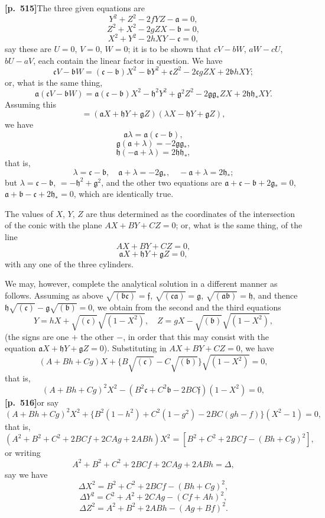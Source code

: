 \documentclass[11pt,a4paper]{article}
\begin{document}
\noindent\textbf{[p.~515]}\quad The three given equations are
\[
Y^{2} + Z^{2} - 2fYZ - \mathfrak{a} = 0,
\]
\[
Z^{2} + X^{2} - 2gZX - \mathfrak{b} = 0,
\]
\[
X^{2} + Y^{2} - 2hXY - \mathfrak{c} = 0,
\]
say these are $U = 0$, $V = 0$, $W = 0$; it is to be shown that $cV - bW$, $aW - cU$, $bU - aV$, each contain the linear factor in question. We have
\[
\mathfrak{c}V - \mathfrak{b}W = (\mathfrak{c} - \mathfrak{b})X^{2} - \mathfrak{b}Y^{2} + \mathfrak{c}Z^{2} - 2\mathfrak{c}gZX + 2\mathfrak{b}hXY;
\]
or, what is the same thing,
\[
\mathfrak{a}(\mathfrak{c}V - \mathfrak{b}W) = \mathfrak{a}(\mathfrak{c} - \mathfrak{b})X^{2} - \mathfrak{h}^{2}Y^{2} + \mathfrak{g}^{2}Z^{2} - 2\mathfrak{g}\mathfrak{g}_{*}ZX + 2\mathfrak{h}\mathfrak{h}_{*}XY.
\]
Assuming this
\[
= (\mathfrak{a}X + \mathfrak{h}Y + \mathfrak{g}Z)(\lambda X - \mathfrak{h}Y + \mathfrak{g}Z),
\]
we have
\[
\mathfrak{a}\lambda = \mathfrak{a}(\mathfrak{c} - \mathfrak{b}),
\]
\[
\mathfrak{g}(\mathfrak{a} + \lambda) = -2\mathfrak{g}\mathfrak{g}_{*},
\]
\[
\mathfrak{h}(-\mathfrak{a} + \lambda) = 2\mathfrak{h}\mathfrak{h}_{*},
\]
that is,
\[
\lambda = \mathfrak{c} - \mathfrak{b},\quad \mathfrak{a} + \lambda = -2\mathfrak{g}_{*},\quad -\mathfrak{a} + \lambda = 2\mathfrak{h}_{*};
\]
but $\lambda = \mathfrak{c} - \mathfrak{b}$, $= -\mathfrak{h}^{2} + \mathfrak{g}^{2}$, and the other two equations are $\mathfrak{a} + \mathfrak{c} - \mathfrak{b} + 2\mathfrak{g}_{*} = 0$, $\mathfrak{a} + \mathfrak{b} - \mathfrak{c} + 2\mathfrak{h}_{*} = 0$, which are identically true.

The values of $X$, $Y$, $Z$ are thus determined as the coordinates of the intersection of the conic with the plane $AX + BY + CZ = 0$; or, what is the same thing, of the line
\[
AX + BY + CZ = 0,
\]
\[
\mathfrak{a}X + \mathfrak{h}Y + \mathfrak{g}Z = 0,
\]
with any one of the three cylinders.

We may, however, complete the analytical solution in a different manner as follows. Assuming as above $\sqrt{(\mathfrak{b}\mathfrak{c})} = \mathfrak{f}$, $\sqrt{(\mathfrak{c}\mathfrak{a})} = \mathfrak{g}$, $\sqrt{(\mathfrak{a}\mathfrak{b})} = \mathfrak{h}$, and thence $\mathfrak{h}\sqrt{(\mathfrak{c})} - \mathfrak{g}\sqrt{(\mathfrak{b})} = 0$, we obtain from the second and the third equations
\[
Y = hX + \sqrt{(\mathfrak{c})}\sqrt{(1 - X^{2})},\quad Z = gX - \sqrt{(\mathfrak{b})}\sqrt{(1 - X^{2})},
\]
(the signs are one $+$ the other $-$, in order that this may consist with the equation $\mathfrak{a}X + \mathfrak{h}Y + \mathfrak{g}Z = 0$). Substituting in $AX + BY + CZ = 0$, we have
\[
(A + Bh + Cg)X + \{B\sqrt{(\mathfrak{c})} - C\sqrt{(\mathfrak{b})}\}\sqrt{(1 - X^{2})} = 0,
\]
that is,
\[
(A + Bh + Cg)^{2}X^{2} - (B^{2}\mathfrak{c} + C^{2}\mathfrak{b} - 2BC\mathfrak{f})(1 - X^{2}) = 0,
\]
\noindent\textbf{[p.~516]}\quad or say
\[
(A + Bh + Cg)^{2}X^{2} + \{B^{2}(1 - h^{2}) + C^{2}(1 - g^{2}) - 2BC(gh - f)\}(X^{2} - 1) = 0,
\]
that is,
\[
(A^{2} + B^{2} + C^{2} + 2BCf + 2CAg + 2ABh)X^{2} = [B^{2} + C^{2} + 2BCf - (Bh + Cg)^{2}],
\]
or writing
\[
A^{2} + B^{2} + C^{2} + 2BCf + 2CAg + 2ABh = \Delta,
\]
say we have
\[
\Delta X^{2} = B^{2} + C^{2} + 2BCf - (Bh + Cg)^{2},
\]
\[
\Delta Y^{2} = C^{2} + A^{2} + 2CAg - (Cf + Ah)^{2},
\]
\[
\Delta Z^{2} = A^{2} + B^{2} + 2ABh - (Ag + Bf)^{2}.
\]
\end{document}
